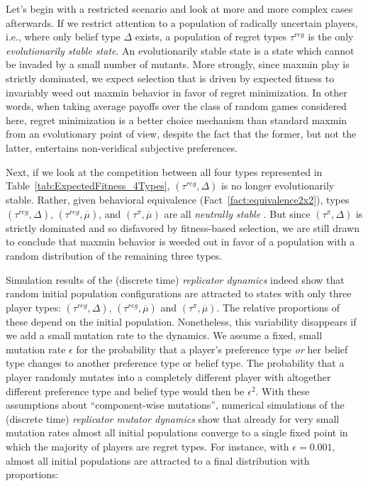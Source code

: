 \documentclass[fleqn,reqno,11pt]{article}
\begin{document}
Let's begin with a restricted scenario and look at more and more complex cases afterwards. If
we restrict attention to a population of radically uncertain players, i.e., where only
belief type $\Delta$ exists, a population of regret types $ \tau^{reg} $ is the only
\emph{evolutionarily stable state}. An evolutionarily stable state is a state which cannot be
invaded by a small number of mutants. More strongly, since maxmin play is strictly dominated,
we expect selection that is driven by expected fitness to invariably weed out maxmin behavior
in favor of regret minimization. In other words, when taking average payoffs over the class of
random games considered here, regret minimization is a better choice mechanism than standard maxmin
from an evolutionary point of view, despite the fact that the former, but not the latter,
entertains non-veridical subjective preferences.

Next, if we look at the competition between all four types represented in
Table~\ref{tab:ExpectedFitness_4Types}, $(\tau^{reg}, \Delta)$ is no longer
evolutionarily stable. Rather, given behavioral equivalence (Fact~\ref{fact:equivalence2x2}),
types $(\tau^{reg}, \Delta)$, $(\tau^{reg}, \overline{\mu})$, and
$(\tau^{\pi}, \overline{\mu})$ are all \emph{neutrally stable}
\citep{Maynard-Smith1982:Evolution-and-t}. But since $(\tau^{\pi}, \Delta)$ is strictly
dominated and so disfavored by fitness-based selection, we are still drawn to conclude that
maxmin behavior is weeded out in favor of a population with a random distribution of the
remaining three types.

Simulation results of the (discrete time) \emph{replicator dynamics}
\citep{TaylorJonker1978:Evolutionary-St} indeed show that random initial population
configurations are attracted to states with only three player types:
$(\tau^{reg}, \Delta)$, $(\tau^{reg}, \overline{\mu})$ and
$(\tau^{\pi}, \overline{\mu})$. The relative proportions of these depend on the initial
population.  Nonetheless, this
variability disappears if we add a small mutation rate to the dynamics. We assume a fixed,
small mutation rate $\epsilon$ for the probability that a player's preference type \emph{or}
her belief type changes to another preference type or belief type. The probability
that a player randomly mutates into a completely different player with altogether
different preference type and belief type would then be $\epsilon^2$. With these assumptions
about ``component-wise mutations'', numerical simulations of the (discrete time)
\emph{replicator mutator dynamics} \citep{Nowak2006:Evolutionary-Dy} show that already for very
small mutation rates almost all initial populations converge to a single fixed point in which
the majority of players are regret types. For instance, with $\epsilon = 0.001$, almost all
initial populations are attracted to a final distribution with proportions:
\end{document}
